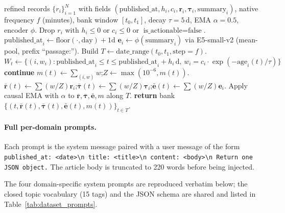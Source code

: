 \documentclass{article}
\begin{document}
\begin{algorithm}[H]
\caption{Build time-aligned regime bank from refined articles.}
\label{alg:bank}
\begin{algorithmic}[1]
\Require refined records $\{r_i\}_{i=1}^N$ with fields $(\text{published\_at},h_i,c_i,\bm{r}_i,\bm{\tau}_i,\text{summary}_i)$, native frequency $f$ (minutes), bank window $[t_0,t_1]$, decay $\tau{=}5$\,d, EMA $\alpha{=}0.5$, encoder $\phi$.
\State Drop $r_i$ with $h_i\!\le\!0$ or $c_i\!\le\!0$ or $\text{is\_actionable}{=}\text{false}$.
\label{line:dateonly}
  \State $\text{published\_at}_i\!\gets\!\text{floor}(\cdot,\text{day}){+}1\text{d}$ 
\EndIf
\State $\bm{e}_i\!\gets\!\phi(\text{summary}_i)$ via E5-small-v2 (mean-pool, prefix ``passage:'').
\State Build $T\!\gets\!\text{date\_range}(t_0,t_1,\text{step}{=}f)$.
  \State $W_t\!\gets\!\{(i,w_i):\text{published\_at}_i\!\le\!t\!\le\!\text{published\_at}_i{+}h_i\,\text{d},\,w_i{=}c_i\!\cdot\!\exp(-\text{age}_i(t)/\tau)\}$\label{line:cutoff}
   \textbf{continue} \EndIf
  \State $m(t)\!\gets\!\sum_{(i,w)} w$;\quad $Z\!\gets\!\max(10^{-6},m(t))$.
  \State $\bar{\bm r}(t)\!\gets\!\sum (w/Z)\bm{r}_i$;\quad $\bar{\bm\tau}(t)\!\gets\!\sum (w/Z)\bm{\tau}_i$;\quad $\bar{\bm e}(t)\!\gets\!\sum (w/Z)\bm{e}_i$.
\EndFor
\State Apply causal EMA with $\alpha$ to $\bar{\bm r},\bar{\bm\tau},\bar{\bm e},m$ along $T$.
\State \textbf{return} bank $\{(t,\bar{\bm r}(t),\bar{\bm\tau}(t),\bar{\bm e}(t),m(t))\}_{t\in T}$.
\end{algorithmic}
\end{algorithm}

\paragraph{Full per-domain prompts.}
Each prompt is the system message paired with a user message of the form \texttt{published\_at: <date>\textbackslash n title: <title>\textbackslash n content: <body>\textbackslash n Return one JSON object.} The article body is truncated to 220 words before being injected.

The four domain-specific system prompts are reproduced verbatim below; the closed topic vocabulary (15 tags) and the JSON schema are shared and listed in Table~\ref{tab:dataset_prompts}.
\end{document}
